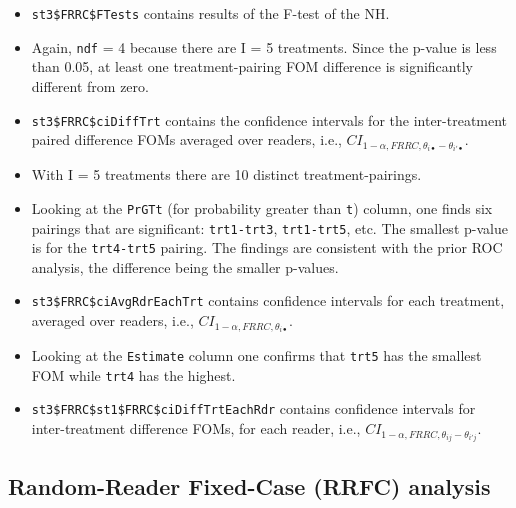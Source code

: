 \documentclass[
]{book}
\begin{document}
\begin{itemize}
\item
  \texttt{st3\$FRRC\$FTests} contains results of the F-test of the NH.
\item
  Again, \texttt{ndf} = 4 because there are I = 5 treatments. Since the p-value is less than 0.05, at least one treatment-pairing FOM difference is significantly different from zero.
\item
  \texttt{st3\$FRRC\$ciDiffTrt} contains the confidence intervals for the inter-treatment paired difference FOMs averaged over readers, i.e., \(CI_{1-\alpha,FRRC,\theta_{i \bullet} - \theta_{i' \bullet}}\).
\item
  With I = 5 treatments there are 10 distinct treatment-pairings.
\item
  Looking at the \texttt{PrGTt} (for probability greater than \texttt{t}) column, one finds six pairings that are significant: \texttt{trt1-trt3}, \texttt{trt1-trt5}, etc. The smallest p-value is for the \texttt{trt4-trt5} pairing. The findings are consistent with the prior ROC analysis, the difference being the smaller p-values.
\item
  \texttt{st3\$FRRC\$ciAvgRdrEachTrt} contains confidence intervals for each treatment, averaged over readers, i.e., \(CI_{1-\alpha,FRRC,\theta_{i \bullet}}\).
\item
  Looking at the \texttt{Estimate} column one confirms that \texttt{trt5} has the smallest FOM while \texttt{trt4} has the highest.
\item
  \texttt{st3\$FRRC\$st1\$FRRC\$ciDiffTrtEachRdr} contains confidence intervals for inter-treatment difference FOMs, for each reader, i.e., \(CI_{1-\alpha,FRRC,\theta_{i j} - \theta_{i' j}}\).
\end{itemize}

\hypertarget{or-applications-RRFC-dataset04-FROC}{%
\subsection{Random-Reader Fixed-Case (RRFC) analysis}\label{or-applications-RRFC-dataset04-FROC}}
\end{document}
